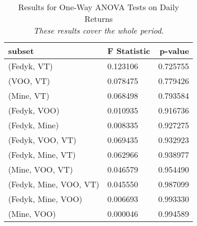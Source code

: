\begin{appendices}
\begin{table}[ht]
\centering
\caption{Results for One-Way ANOVA Tests on Daily Returns 
\\ \footnotesize{\textit{These results cover the whole period.}}}
    \begin{tabular}{l|ll}
    \toprule
        \textbf{subset}        & \multicolumn{1}{r}{\textbf{F Statistic}} & \multicolumn{1}{r}{\textbf{p-value}} \\ \midrule
        (Fedyk, VT)            & 0.123106                                 & 0.725755                             \\
        (VOO, VT)              & 0.078475                                 & 0.779426                             \\
        (Mine, VT)             & 0.068498                                 & 0.793584                             \\
        (Fedyk, VOO)           & 0.010935                                 & 0.916736                             \\
        (Fedyk, Mine)          & 0.008335                                 & 0.927275                             \\
        (Fedyk, VOO, VT)       & 0.069435                                 & 0.932923                             \\
        (Fedyk, Mine, VT)      & 0.062966                                 & 0.938977                             \\
        (Mine, VOO, VT)        & 0.046579                                 & 0.954490                             \\
        (Fedyk, Mine, VOO, VT) & 0.045550                                 & 0.987099                             \\
        (Fedyk, Mine, VOO)     & 0.006693                                 & 0.993330                             \\
        (Mine, VOO)            & 0.000046                                 & 0.994589                            
    \end{tabular}
\label{tab:anova_all}
\end{table}



\end{appendices}
